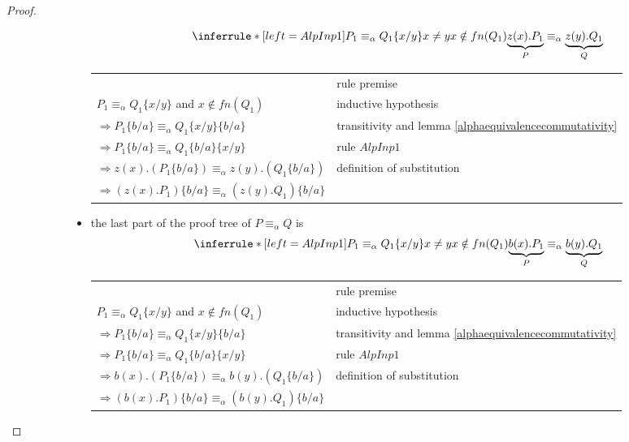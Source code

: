 \begin{lemma}
\begin{proof}
\begin{description}
\begin{description}
\begin{itemize}
		\[\inferrule*[left=AlpInp1]{
		    P_{1}\equiv_{\alpha}Q_{1}\{x/y\}
		  \\
		    x\neq y	      
		  \\
		    x\notin fn(Q_{1})
		}{
		  \underbrace{z(x).P_{1}}_{P}
		    \equiv_{\alpha}
		      \underbrace{z(y).Q_{1}}_{Q}
		}\]
		\begin{center}
		  \begin{tabular}{ll}
		      &
		    rule premise
		  \\
		    $P_{1}\equiv_{\alpha}Q_{1}\{x/y\}$ and $x\notin fn(Q_{1})$ 
		      &
		    inductive hypothesis
		  \\
		    $\Rightarrow P_{1}\{b/a\}\equiv_{\alpha}Q_{1}\{x/y\}\{b/a\}$
		      &
		    transitivity and lemma \ref{alphaequivalencecommutativity}
		  \\
		    $\Rightarrow P_{1}\{b/a\}\equiv_{\alpha}Q_{1}\{b/a\}\{x/y\}$
		      &
		    rule $AlpInp1$
		  \\
		    $\Rightarrow z(x).(P_{1}\{b/a\})\equiv_{\alpha}z(y).(Q_{1}\{b/a\})$
		      &
		    definition of substitution
		  \\
		    $\Rightarrow (z(x).P_{1})\{b/a\}\equiv_{\alpha}(z(y).Q_{1})\{b/a\}$
		      &
		    
		  \\
		  \end{tabular}
		\end{center}	    	
	      \item 
		the last part of the proof tree of $P\equiv_{\alpha}Q$ is
		\[\inferrule*[left=AlpInp1]{
		    P_{1}\equiv_{\alpha}Q_{1}\{x/y\}
		  \\
		    x\neq y	      
		  \\
		    x\notin fn(Q_{1})
		}{
		  \underbrace{b(x).P_{1}}_{P}
		    \equiv_{\alpha}
		      \underbrace{b(y).Q_{1}}_{Q}
		}\]
		\begin{center}
		  \begin{tabular}{ll}
		      &
		    rule premise
		  \\
		    $P_{1}\equiv_{\alpha}Q_{1}\{x/y\}$ and $x\notin fn(Q_{1})$ 
		      &
		    inductive hypothesis
		  \\
		    $\Rightarrow P_{1}\{b/a\}\equiv_{\alpha}Q_{1}\{x/y\}\{b/a\}$
		      &
		    transitivity and lemma \ref{alphaequivalencecommutativity}
		  \\
		    $\Rightarrow P_{1}\{b/a\}\equiv_{\alpha}Q_{1}\{b/a\}\{x/y\}$
		      &
		    rule $AlpInp1$
		  \\
		    $\Rightarrow b(x).(P_{1}\{b/a\})\equiv_{\alpha}b(y).(Q_{1}\{b/a\})$
		      &
		    definition of substitution
		  \\
		    $\Rightarrow (b(x).P_{1})\{b/a\}\equiv_{\alpha}(b(y).Q_{1})\{b/a\}$
		      &
		    

\end{tabular}
\end{center}
\end{itemize}
\end{description}
\end{description}
\end{proof}
\end{lemma}
